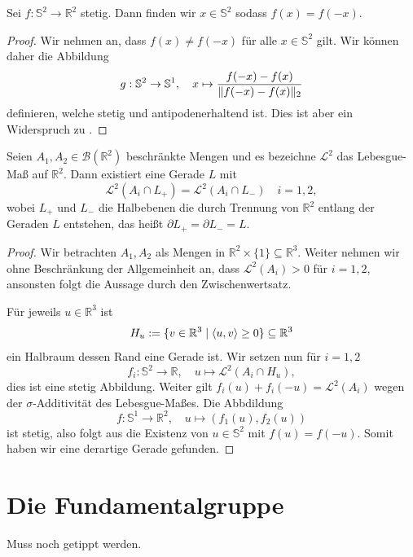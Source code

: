 \documentclass[
12pt, 
openany, 
a4paper, 
final,
fleqn, 
]{myclass}
\numberwithin{equation}{chapter}
\numberwithin{section}{chapter}
\newcommand{\RR}{\mathbb R}
\newcommand{\Ss}{\mathbb S}
\DeclarePairedDelimiter{\norm}{\lVert}{\rVert}
\DeclarePairedDelimiter{\scalar}{\langle}{\rangle}
\newcommand{\todo}[1]{}
\begin{document}
\begin{thr}\label{6.5}
Sei $f: \Ss^2 \to \RR^2$ stetig. Dann finden wir $x\in \Ss^2$ sodass $f(x) = f(-x)$. 
\end{thr}
\begin{proof}
Wir nehmen an, dass $f(x) \neq f(-x) $ für alle $x\in \Ss^2$ gilt. Wir können daher die Abbildung 
\[
g: \Ss^2 \to \Ss^1, \quad x\mapsto \frac{f(-x) - f(x) }{ \norm{f(-x) - f(x) }_2}
\]
definieren, welche stetig und antipodenerhaltend ist. Dies ist aber ein Widerspruch zu . 
\end{proof}
\begin{thr}
Seien $A_1, A_2 \in \mathcal B(\RR^2)$ beschränkte Mengen und es bezeichne $\mathcal L^2$ das Lebesgue-Maß auf $\RR^2$. Dann existiert eine Gerade $L$ mit 
\[
\mathcal L^2 (A_i \cap L_+) = \mathcal L^2(A_i \cap L_-) \quad i=1, 2, 
\]
wobei $L_+$ und $L_-$ die Halbebenen die durch Trennung von $\RR^2$ entlang der Geraden $L$ entstehen, das heißt $\partial L_+ = \partial L_- = L$. 
\end{thr}
\begin{proof}
Wir betrachten $A_1, A_2$ als Mengen in $\RR^2\times \{1\} \subseteq \RR^3$. Weiter nehmen wir ohne Beschränkung der Allgemeinheit an, dass $\mathcal L^2(A_i) >0$ für $i=1, 2$, ansonsten folgt die Aussage durch den Zwischenwertsatz. 

Für jeweils $u\in \RR^3$ ist 
\[
H_u := \{v\in \RR^3 \mid \scalar{u, v} \geq 0 \} \subseteq \RR^3
\]
ein Halbraum dessen Rand eine Gerade ist. Wir setzen nun für $i=1, 2$
\[
f_i : \Ss^2 \to \RR, \quad u\mapsto \mathcal L^2(A_i\cap H_u), 
\]
dies ist eine stetig Abbildung. Weiter gilt $f_i(u) + f_i(-u) = \mathcal L^2(A_i)$ wegen der $\sigma$-Additivität des Lebesgue-Maßes.  Die Abbdildung 
\[
f: \Ss^1 \to \RR^2, \quad u \mapsto \left(f_1(u), f_2(u) \right)
\]
ist stetig, also folgt aus  die Existenz von $u\in \Ss^2$ mit $f(u) = f(-u)$. Somit haben wir eine derartige Gerade gefunden. \todo{braucht es hier mehr??}
\end{proof}


\chapter{Die Fundamentalgruppe}

{\color{red} Muss noch getippt werden.}
\end{document}

